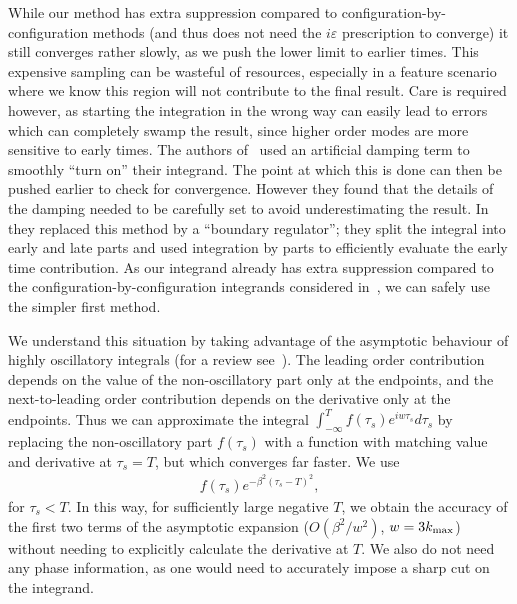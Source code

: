 While our method has extra suppression compared to configuration-by-configuration methods
(and thus does not need the $i\varepsilon$ prescription to converge)
it still converges rather slowly, as we push the lower limit to earlier times.
This expensive sampling can be wasteful of resources,
especially in a feature scenario where we know this
region will not contribute to the final result.
Care is required however, as starting the integration in the wrong way can easily lead to
errors which can completely swamp the result, since higher order modes
are more sensitive to early times.
The authors of~\cite{chen_easther_lim_1} used an artificial damping term to smoothly
``turn on'' their integrand.
The point at which this is done can then be pushed earlier to check for convergence.
However they found that the details of the damping needed to
be carefully set to avoid underestimating the result.
In~\cite{chen_easther_lim_2} they replaced this method by a ``boundary regulator'';
they split the integral into early and late parts and used integration by parts to
efficiently evaluate the early time contribution.
As our integrand already has extra suppression compared to the configuration-by-configuration
integrands considered in~\cite{chen_easther_lim_1,chen_easther_lim_2},
we can safely use the simpler first method.


We understand this situation by
taking advantage of the asymptotic behaviour of highly oscillatory
integrals (for a review see~\cite{iserles_2005}).
The leading order contribution depends on
the value of the non-oscillatory part only at the endpoints,
and the next-to-leading order contribution depends on the
derivative only at the endpoints. Thus we can approximate the integral
$\int_{-\infty}^T f(\tau_s)e^{iw\tau_s}d\tau_s$
by replacing the non-oscillatory part $f(\tau_s)$ with a function with
matching value and derivative at $\tau_s=T$,
but which converges far faster.
We use
\begin{align}\label{smooth_cutoff}
f(\tau_s)e^{-\beta^2(\tau_s-T)^2},
\end{align}
for $\tau_s<T$.
In this way, for sufficiently large negative $T$,
we obtain the accuracy of the
first two terms of the asymptotic expansion
($O(\beta^2/w^2)$, $w=3{k_\text{max}}$) without needing to explicitly
calculate the derivative at $T$. We also do not need any phase information, as
one would need to accurately impose a sharp cut on the integrand.


